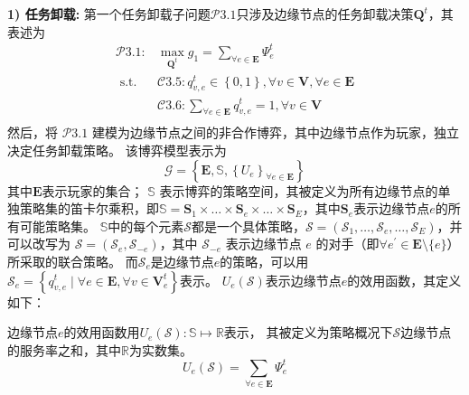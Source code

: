 \textbf{1) 任务卸载:} 第一个任务卸载子问题$\mathcal{P}3.1$只涉及边缘节点的任务卸载决策$\mathbf{Q}^{t}$，其表述为
\begin{equation}
	\begin{aligned}
		\mathcal{P}3.1: &\max_{\mathbf{Q}^{t}} g_1= \sum_{ \forall e \in \mathbf{E}} \Psi_{e}^{t}  \\
		\text { s.t. }  
		&\mathcal{C}3.5: q_{v, e}^t \in \left \{0, 1\right \}, \forall v \in \mathbf{V}, \forall e \in \mathbf{E}  \\
        &\mathcal{C}3.6: \sum_{\forall e \in \mathbf{E}} q_{v, e}^t = 1, \forall v \in \mathbf{V} \\
	\end{aligned}
\end{equation}
然后，将 $\mathcal{P}3.1$ 建模为边缘节点之间的非合作博弈，其中边缘节点作为玩家，独立决定任务卸载策略。
该博弈模型表示为
\begin{equation}
	\mathcal{G} = \left\{\mathbf{E}, \mathbb{S}, \left\{{U}_{e}\right\}_{\forall e \in \mathbf{E}} \right\}
\end{equation}
其中$\mathbf{E}$表示玩家的集合；
$\mathbb{S}$ 表示博弈的策略空间，其被定义为所有边缘节点的单独策略集的笛卡尔乘积，即$\mathbb{S} = \mathbf{S}_{1} \times \ldots \times \mathbf{S}_{e} \times \ldots \times \mathbf{S}_{E}$，其中$\mathbf{S}_{e}$表示边缘节点$e$的所有可能策略集。
$\mathbb{S}$中的每个元素$\mathcal{S}$都是一个具体策略，$\mathcal{S} = \left(\mathcal{S}_{1}, \ldots, \mathcal{S}_{e}, \ldots, \mathcal{S}_{E} \right)$，并可以改写为 $\mathcal{S}=\left( \mathcal{S}_{e}, \mathcal{S}_{-e}\right)$，其中 $\mathcal{S}_{-e}$ 表示边缘节点 $e$ 的对手（即$\forall e^{\prime} \in \mathbf{E} \setminus \{e\}$）所采取的联合策略。
而$\mathcal{S}_{e}$是边缘节点$e$的策略，可以用$\mathcal{S}_{e} = \left\{ q_{v, e}^t \mid \forall e \in \mathbf{E}, \forall v \in \mathbf{V}_{e}^{t} \right\}$表示。
${U}_{e}\left(\mathcal{S}\right)$表示边缘节点$e$的效用函数，其定义如下：
\begin{definition}
边缘节点$e$的效用函数用${U}_{e}\left(\mathcal{S}\right): \mathbb{S} \mapsto \mathbb{R}$表示， 其被定义为策略概况下$\mathcal{S}$边缘节点的服务率之和，其中$\mathbb{R}$为实数集。
	\begin{equation}
		{U}_{e}\left(\mathcal{S}\right) = \sum_{\forall e \in \mathbf{E}} \Psi_{e}^{t}
	\end{equation}
\end{definition}


